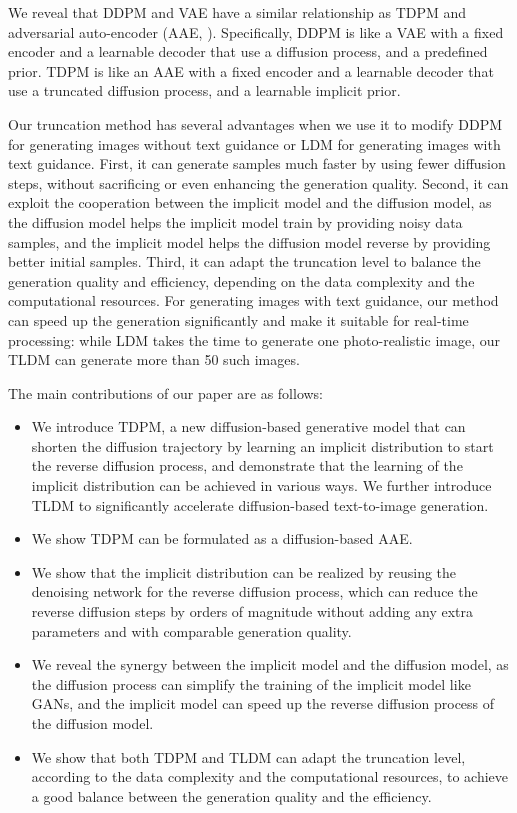 \documentclass{article} \usepackage{iclr2023_conference,times}
\theoremstyle{plain}
\theoremstyle{definition}
\theoremstyle{remark}
\begin{document}
We reveal that DDPM and VAE have a similar relationship as TDPM and adversarial auto-encoder (AAE, \citet{makhzani2015adversarial}). Specifically, DDPM is like a VAE with a fixed encoder and a learnable decoder that use a diffusion process, and a predefined prior. TDPM is like an AAE with a fixed encoder and a learnable decoder that use a truncated diffusion process, and a learnable implicit prior. 


{Our truncation method has several advantages when we use it to modify DDPM for generating images without text guidance or LDM for generating images with text guidance. First, it can generate samples much faster by using fewer diffusion steps, without sacrificing or even enhancing the generation quality. Second, it can exploit the cooperation between the implicit model and the diffusion model, as the diffusion model helps the implicit model train by providing noisy data samples, and the implicit model helps the diffusion model reverse by providing better initial samples. Third, it can adapt the truncation level to balance the generation quality and efficiency, depending on the data complexity and the computational resources. 
For generating images with text guidance, our method can speed up the generation significantly and make it suitable for real-time processing: while LDM takes the time to generate one photo-realistic image, our TLDM can generate more than 50 such images.}








The main contributions of our paper are as follows:
\begin{itemize}
    \item We introduce TDPM, a new diffusion-based generative model that can shorten the diffusion trajectory by learning an implicit distribution to start the reverse diffusion process, and demonstrate that the learning of the implicit distribution can be achieved in various ways. We further introduce TLDM to significantly accelerate diffusion-based text-to-image generation.
    \item We show TDPM can be formulated as a diffusion-based AAE.
    \item We show that the implicit distribution can be realized by reusing the denoising network for the reverse diffusion process, which can reduce the reverse diffusion steps by orders of magnitude without adding any extra parameters and with comparable generation quality. 
    \item We reveal the synergy between the implicit model and the diffusion model, as the diffusion process can simplify the training of the implicit model like GANs, and the implicit model can speed up the reverse diffusion process of the diffusion model.
    \item We show that both TDPM and TLDM can adapt the truncation level, according to the data complexity and the computational resources, to achieve a good balance between the generation quality and the efficiency.
\end{itemize}
\end{document}
